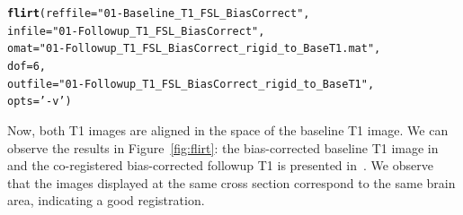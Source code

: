 \documentclass[a4paper]{report}\usepackage[]{graphicx}\usepackage[]{color}
\makeatletter
\newcommand{\hlnum}[1]{\textcolor[rgb]{0.686,0.059,0.569}{#1}}%
\newcommand{\hlstr}[1]{\textcolor[rgb]{0.192,0.494,0.8}{#1}}%
\newcommand{\hlstd}[1]{\textcolor[rgb]{0.345,0.345,0.345}{#1}}%
\newcommand{\hlkwc}[1]{\textcolor[rgb]{0.333,0.667,0.333}{#1}}%
\newcommand{\hlkwd}[1]{\textcolor[rgb]{0.737,0.353,0.396}{\textbf{#1}}}%
\newenvironment{kframe}{%
 \def\at@end@of@kframe{}%
 \ifinner\ifhmode%
  \def\at@end@of@kframe{\end{minipage}}%
  \begin{minipage}{\columnwidth}%
 \fi\fi%
 \def\FrameCommand##1{\hskip\@totalleftmargin \hskip-\fboxsep
 \colorbox{shadecolor}{##1}\hskip-\fboxsep
     \hskip-\linewidth \hskip-\@totalleftmargin \hskip\columnwidth}%
 \MakeFramed {\advance\hsize-\width
   \@totalleftmargin\z@ \linewidth\hsize
   \@setminipage}}%
 {\par\unskip\endMakeFramed%
 \at@end@of@kframe}
\newenvironment{knitrout}{}{} %
\newcommand\gobblepars{%
    \@ifnextchar\par%
        {\expandafter\gobblepars\@gobble}%
        {}}
\makeatother
\begin{document}
\begin{article}
\gobblepars
\begin{knitrout}
\color{fgcolor}\begin{kframe}
\begin{alltt}
\hlkwd{flirt}\hlstd{(}\hlkwc{reffile} \hlstd{=} \hlstr{"01-Baseline_T1_FSL_BiasCorrect"}\hlstd{,}
        \hlkwc{infile} \hlstd{=} \hlstr{"01-Followup_T1_FSL_BiasCorrect"}\hlstd{,}
      \hlkwc{omat} \hlstd{=} \hlstr{"01-Followup_T1_FSL_BiasCorrect_rigid_to_BaseT1.mat"}\hlstd{,}
      \hlkwc{dof} \hlstd{=} \hlnum{6}\hlstd{,}
      \hlkwc{outfile} \hlstd{=} \hlstr{"01-Followup_T1_FSL_BiasCorrect_rigid_to_BaseT1"}\hlstd{,}
      \hlkwc{opts} \hlstd{=} \hlstr{'-v'}\hlstd{)}
\end{alltt}
\end{kframe}
\end{knitrout}
\gobblepars


Now, both T1 images are aligned in the space of the baseline T1 image.  We can observe the results in Figure~\ref{fig:flirt}: the bias-corrected baseline T1 image in~\protect{} and the co-registered bias-corrected followup T1 is presented in~\protect{}.   We observe that the images displayed at the same cross section correspond to the same brain area, indicating a good registration.





\end{article}
\end{document}
